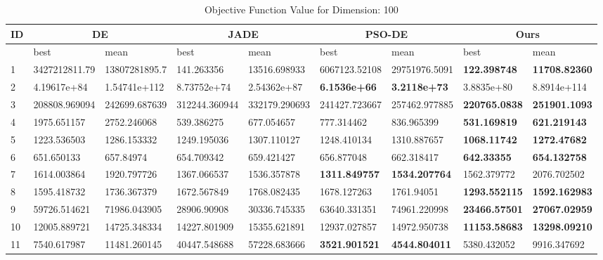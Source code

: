\begin{table*}[t]
\centering
\caption{Objective Function Value for Dimension: 100}
 \begin{tabular}{|p{0.8cm}|p{1.6cm}|p{1.6cm}|p{1.6cm}|p{1.6cm}|p{1.6cm}|p{1.6cm}|p{1.6cm}|p{1.6cm}|} 
\hline
 ID & \multicolumn{2}{c|}{DE} & \multicolumn{2}{c|}{JADE} & \multicolumn{2}{c|}{PSO-DE} & \multicolumn{2}{c|}{Ours} \\
\hline
    & best & mean & best & mean & best & mean & best & mean \\ [0.5ex] 
\hline
1  & 3427212811.79 & 13807281895.7 & 141.263356 & 13516.698933 & 6067123.52108 & 29751976.5091 & \textbf{122.398748} & \textbf{11708.82360} \\ 
2  & 4.19617e+84 & 1.54741e+112 & 8.73752e+74 & 2.54362e+87 & \textbf{6.1536e+66} & \textbf{3.2118e+73} & 3.8835e+80 & 8.8914e+114 \\ 
3  & 208808.969094 & 242699.687639 & 312244.360944 & 332179.290693 & 241427.723667 & 257462.977885 & \textbf{220765.0838} & \textbf{251901.1093} \\ 
4  & 1975.651157 & 2752.246068 & 539.386275 & 677.054657 & 777.314462 & 836.965399 & \textbf{531.169819} & \textbf{621.219143} \\ 
5  & 1223.536503 & 1286.153332 & 1249.195036 & 1307.110127 & 1248.410134 & 1310.887657 & \textbf{1068.11742} & \textbf{1272.47682} \\ 
6  & 651.650133 & 657.84974 & 654.709342 & 659.421427 & 656.877048 & 662.318417 & \textbf{642.33355} & \textbf{654.132758} \\ 
7  & 1614.003864 & 1920.797726 & 1367.066537 & 1536.357878 & \textbf{1311.849757} & \textbf{1534.207764} & 1562.379772 & 2076.702502 \\ 
8  & 1595.418732 & 1736.367379 & 1672.567849 & 1768.082435 & 1678.127263 & 1761.94051 & \textbf{1293.552115} & \textbf{1592.162983} \\ 
9  & 59726.514621 & 71986.043905 & 28906.90908 & 30336.745335 & 63640.331351 & 74961.220998 & \textbf{23466.57501} & \textbf{27067.02959} \\ 
10  & 12005.889721 & 14725.348334 & 14227.801909 & 15355.621891 & 12937.027857 & 14972.950738 & \textbf{11153.58683} & \textbf{13298.09210} \\ 
11  & 7540.617987 & 11481.260145 & 40447.548688 & 57228.683666 & \textbf{3521.901521} & \textbf{4544.804011} & 5380.432052 & 9916.347692 \\ 

\end{tabular}
\end{table*}
